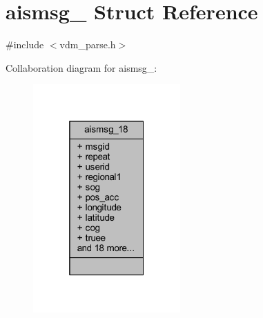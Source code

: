 \hypertarget{structaismsg__18}{}\section{aismsg\+\_ Struct Reference}
\label{structaismsg__18}


{\ttfamily \#include $<$vdm\+\_\+parse.\+h$>$}



Collaboration diagram for aismsg\+\_\+:
\nopagebreak
\begin{figure}[H]
\begin{center}
\leavevmode
\includegraphics[width=160pt]{structaismsg__18__coll__graph}
\end{center}
\end{figure}
